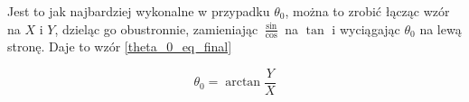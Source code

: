\documentclass[a4paper,13pt]{article}
\begin{document}
Jest to jak najbardziej wykonalne w przypadku $\theta_0$, można to zrobić łącząc wzór na $X$ i $Y$, dzieląc go obustronnie, zamieniając $\frac{\sin}{\cos}$ na $\tan$ i wyciągając $\theta_0$ na lewą stronę. Daje to wzór \ref{theta_0_eq_final}





\begin{equation} \label{theta_0_eq_final}
\theta_0 = \arctan{\frac{Y}{X}}
\end{equation}







\end{document}
